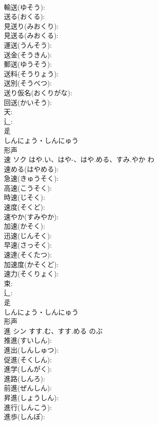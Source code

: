 \documentclass[8pt]{extreport}
\begin{document}
\begin{CJK}{UTF8}{min}
\\	輸送(ゆそう): 
\\	送る(おくる): 
\\	見送り(みおくり): 
\\	見送る(みおくる): 
\\	運送(うんそう): 
\\	送金(そうきん): 
\\	郵送(ゆうそう): 
\\	送料(そうりょう): 
\\	送別(そうべつ): 
\\	送り仮名(おくりがな): 
\\	回送(かいそう): 
\\	天: 
\\	辶: 
\\	辵	
\\	しんにょう・しんにゅう	
\\	形声 
\\	速	ソク	はや.い、はや-、はや.める、すみ.やか	わ	
\\	速める(はやめる): 
\\	急速(きゅうそく): 
\\	高速(こうそく): 
\\	時速(じそく): 
\\	速度(そくど): 
\\	速やか(すみやか): 
\\	加速(かそく): 
\\	迅速(じんそく): 
\\	早速(さっそく): 
\\	速達(そくたつ): 
\\	加速度(かそくど): 
\\	速力(そくりょく): 
\\	束: 
\\	辶: 
\\	辵	
\\	しんにょう・しんにゅう	
\\	形声 
\\	進	シン	すす.む、すす.める	のぶ	
\\	推進(すいしん): 
\\	進出(しんしゅつ): 
\\	促進(そくしん): 
\\	進学(しんがく): 
\\	進路(しんろ): 
\\	前進(ぜんしん): 
\\	昇進(しょうしん): 
\\	進行(しんこう): 
\\	進歩(しんぽ): 

\end{CJK}
\end{document}
